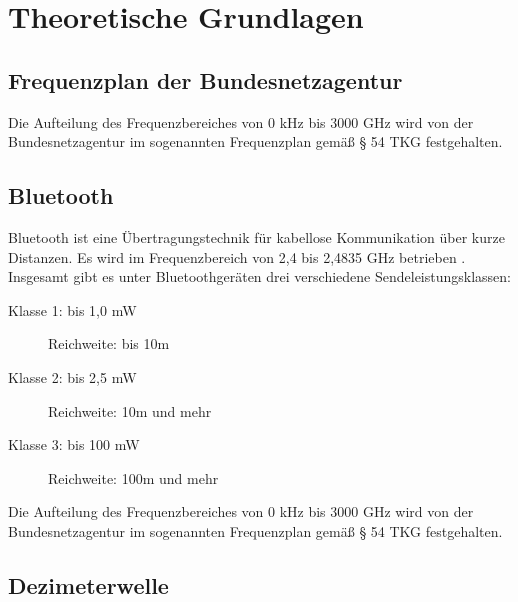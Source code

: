 
\chapter{Theoretische Grundlagen}
\section{Frequenzplan der Bundesnetzagentur}
Die Aufteilung des Frequenzbereiches von 0 kHz bis 3000 GHz wird von der Bundesnetzagentur im sogenannten Frequenzplan \cite[Bundesnetzagentur, 2016]{bundesnetzagentur-frequenzplan:2016} gemäß § 54 TKG festgehalten.

\section{Bluetooth}
Bluetooth ist eine Übertragungstechnik für kabellose Kommunikation über kurze Distanzen. Es wird im Frequenzbereich von 2,4 bis 2,4835 GHz betrieben \cite[Bundesamt für Strahlenschutz, S. 1]{bundesamt-strahlungsschutz:2012}. Insgesamt gibt es unter Bluetoothgeräten drei verschiedene Sendeleistungsklassen:
\begin{description}
	\item[Klasse 1: bis 1,0 mW] Reichweite: bis 10m 
	\item [Klasse 2: bis 2,5 mW] Reichweite: 10m und mehr
	\item [Klasse 3: bis 100 mW] Reichweite: 100m und mehr
\end{description}
Die Aufteilung des Frequenzbereiches von 0 kHz bis 3000 GHz wird von der Bundesnetzagentur im sogenannten Frequenzplan \cite[Bundesnetzagentur]{bundesnetzagentur-frequenzplan:2016} gemäß § 54 TKG festgehalten.
\section{Dezimeterwelle}


